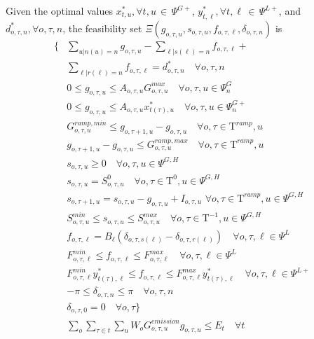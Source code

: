 \documentclass[final]{IEEEtran}
\newcommand{\myin}{\,{\in}\,}
\newcommand{\Tau}{\mathrm{T}}
\begin{document}
Given the optimal values \( x_{t, u}^*, \forall t, u \myin \Psi^{G+} \), \( y_{t, \ell}^*, \forall t, \ell \myin \Psi^{L+} \), and \( d_{o, \tau, n}^*, \forall o, \tau, n \), the feasibility set \( \Xi(g_{o, \tau, u}, s_{o, \tau, u}, f_{o, \tau, \ell}, \delta_{o, \tau, n}) \) is
\begin{align}
\{ &\sum\limits_{u | n(u) = n} g_{o, \tau, u} - \sum\limits_{\ell | s(\ell) = n} f_{o, \tau, \ell} + \nonumber \\
&\label{feas_balance} \sum\limits_{\ell | r(\ell) = n} f_{o, \tau, \ell} = d_{o, \tau, n}^* \quad \forall o, \tau, n\\
&\label{feas_availability1}0 \leq g_{o, \tau, u} \leq A_{o, \tau, u} G_{o, \tau, u}^{max} \quad \forall o, \tau, u \in \Psi_n^G \\
&\label{feas_availability2}0 \leq g_{o, \tau, u} \leq A_{o, \tau, u} x_{t(\tau), u}^* \quad \forall o, \tau, u \in \Psi_n^{G+} \\
&\label{feas_ramp1}G^{ramp,min}_{o, \tau, u} \leq g_{o, \tau + 1, u} - g_{o, \tau, u} \quad \forall o, \tau \in \Tau^{ramp}, u \\
&\label{feas_ramp2}g_{o, \tau + 1, u} - g_{o, \tau, u} \leq G^{ramp,max}_{o, \tau, u} \quad \forall o, \tau \in \Tau^{ramp}, u \\
&\label{feas_storage1}s_{o, \tau, u} \geq 0 \quad \forall o, \tau, u \in \Psi^{G, H} \\
&\label{feas_storage2}s_{o, \tau, u} = S^0_{o, \tau, u} \quad \forall o, \tau \in \Tau^0, u \in \Psi^{G, H} \\
&\label{feas_storage3}s_{o, \tau + 1, u} = s_{o, \tau, u} - g_{o, \tau, u} + I_{o, \tau, u} \, \, \forall o, \tau \in \Tau^{ramp}, u \in \Psi^{G, H} \\
&\label{feas_storage4}S^{min}_{o, \tau, u} \leq s_{o, \tau, u} \leq S^{max}_{o, \tau, u} \quad \forall o, \tau \in \Tau^{-1}, u \in \Psi^{G, H} \\
&\label{feas_flow_ac}f_{o, \tau, \ell} = B_\ell (\delta_{o, \tau, s(\ell)} - \delta_{o, \tau, r(\ell)}) \quad \forall o, \tau, \ell \in \Psi^L \\
&\label{feas_flow_max}F_{o, \tau, \ell}^{min} \leq f_{o, \tau, \ell} \leq F_{o, \tau, \ell}^{max} \quad \forall o, \tau, \ell \in \Psi^L \\
&\label{feas_flow_candidate_max}F_{o, \tau, \ell}^{min} y_{t(\tau), \ell}^* \leq f_{o, \tau, \ell} \leq F_{o, \tau, \ell}^{max} y_{t(\tau), \ell}^* \quad \forall o, \tau, \ell \in \Psi^{L+} \\
&\label{feas_voltage_angle}-\pi \leq \delta_{o, \tau, n} \leq \pi \quad \forall o, \tau, n \\
&\label{feas_voltage_angle_ref}\delta_{o, \tau, 0} = 0 \quad \forall o, \tau \} \\
&\label{feas_emission_ub}\sum\limits_{o} \sum\limits_{\tau \in t} \sum\limits_{u} W_o G^{emission}_{o, \tau, u} g_{o, \tau, u} \leq E_{t} \quad \forall t
\end{align}
\end{document}
